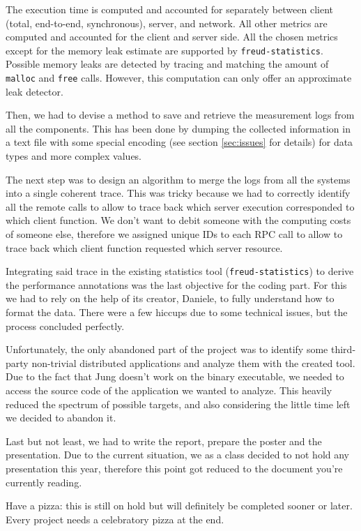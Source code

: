 \documentclass[11pt,english,singlespacing,headsepline,consistentlayout]{auxiliary/si-msc-thesis}
\begin{document}
        The execution time is computed and accounted for separately
between client (total, end-to-end, synchronous), server, and network.
All other metrics are computed and accounted for the client and server
side.  All the chosen metrics except for the memory leak estimate are
supported by \texttt{freud-statistics}.  Possible memory leaks are
detected by tracing and matching the amount of \texttt{malloc} and
\texttt{free} calls.  However, this computation can only offer an
approximate leak detector.

        Then, we had to devise a method to save and retrieve the
measurement logs from all the components.  This has been done by
dumping the collected information in a text file with some special
encoding (see section \ref{sec:issues} for details) for data types and
more complex values.

        The next step was to design an algorithm to merge the logs
from all the systems into a single coherent trace. This was tricky
because we had to correctly identify all the remote calls to allow to
trace back which server execution corresponded to which client
function. We don't want to debit someone with the computing costs of
someone else, therefore we assigned unique IDs to each RPC call to
allow to trace back which client function requested which server
resource.

        Integrating said trace in the existing statistics tool
(\texttt{freud-statistics}) to derive the performance annotations was
the last objective for the coding part. For this we had to rely on the
help of its creator, Daniele, to fully understand how to format the
data. There were a few hiccups due to some technical issues, but the
process concluded perfectly.

        Unfortunately, the only abandoned part of the project was to
identify some third-party non-trivial distributed applications and
analyze them with the created tool. Due to the fact that Jung doesn't
work on the binary executable, we needed to access the source code of
the application we wanted to analyze. This heavily reduced the
spectrum of possible targets, and also considering the little time
left we decided to abandon it.

        Last but not least, we had to write the report, prepare the
poster and the presentation. Due to the current situation, we as a
class decided to not hold any presentation this year, therefore this
point got reduced to the document you're currently reading.
        
        Have a pizza: this is still on hold but will definitely be
completed sooner or later. Every project needs a celebratory pizza at
the end.
        
\end{document}

